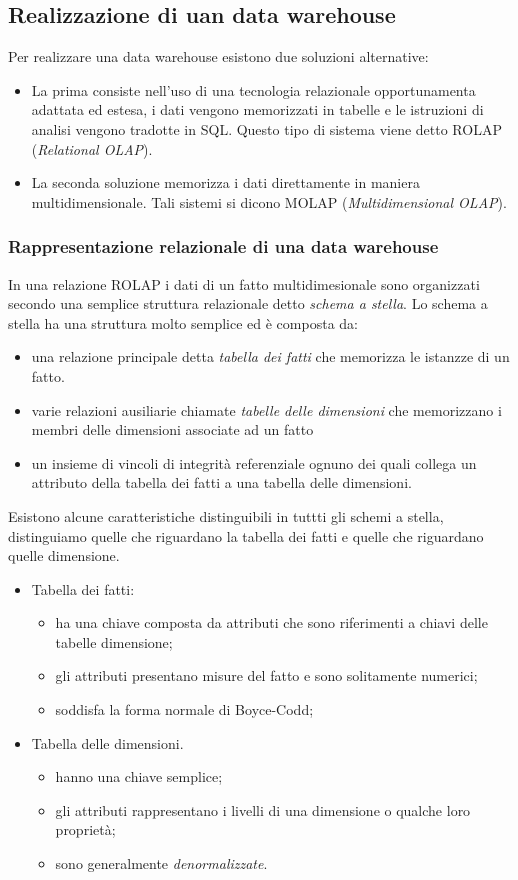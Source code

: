 \subsection{Realizzazione di uan data warehouse}
Per realizzare una data warehouse esistono due soluzioni alternative:
\begin{itemize}
\item La prima consiste nell'uso di una tecnologia relazionale opportunamenta adattata ed estesa, i dati vengono memorizzati in tabelle e le istruzioni di analisi vengono tradotte in SQL. Questo tipo di sistema viene detto ROLAP (\emph{Relational OLAP}).
\item La seconda soluzione memorizza i dati direttamente in maniera multidimensionale. Tali sistemi si dicono MOLAP (\emph{Multidimensional OLAP}).
\end{itemize}
\subsubsection{Rappresentazione relazionale di una data warehouse}
In una relazione ROLAP i dati di un fatto multidimesionale sono organizzati secondo una semplice struttura relazionale detto \emph{schema a stella}.
Lo schema a stella ha una struttura molto semplice ed è composta da:
\begin{itemize}
\item una relazione principale detta \emph{tabella dei fatti} che memorizza le istanzze di un fatto.
\item varie relazioni ausiliarie chiamate \emph{tabelle delle dimensioni} che memorizzano i membri delle dimensioni associate ad un fatto
\item un insieme di vincoli di integrità referenziale ognuno dei quali collega un attributo della tabella dei fatti a una tabella delle dimensioni.
\end{itemize}
Esistono alcune caratteristiche distinguibili in tuttti gli schemi a stella, distinguiamo quelle che riguardano la tabella dei fatti e quelle che riguardano quelle dimensione.
\begin{itemize}
\item Tabella dei fatti:
	\begin{itemize}
\item ha una chiave composta da attributi che sono riferimenti a chiavi delle tabelle dimensione;
\item gli attributi presentano misure del fatto e sono solitamente numerici;
\item soddisfa la forma normale di Boyce-Codd;
	\end{itemize}
\item Tabella delle dimensioni.
	\begin{itemize}
\item hanno una chiave semplice;
\item gli attributi rappresentano i livelli di una dimensione o qualche loro proprietà;
\item sono generalmente \emph{denormalizzate}.
	\end{itemize}
\end{itemize}
